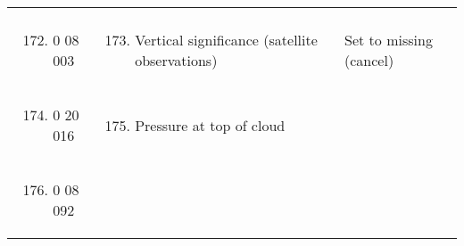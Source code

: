 \begin{longtable}[]{@{}llll@{}}
\begin{minipage}[t]{0.22\columnwidth}
\strut
\end{minipage}\tabularnewline
\begin{minipage}[t]{0.22\columnwidth}\raggedright
\strut
\end{minipage} & \begin{minipage}[t]{0.22\columnwidth}\raggedright
\begin{enumerate}
\setcounter{enumi}{171}
\item
  0 08 003
\end{enumerate}\strut
\end{minipage} & \begin{minipage}[t]{0.22\columnwidth}\raggedright
\begin{enumerate}
\setcounter{enumi}{172}
\item
  Vertical significance (satellite observations)
\end{enumerate}\strut
\end{minipage} & \begin{minipage}[t]{0.22\columnwidth}\raggedright
Set to missing (cancel)\strut
\end{minipage}\tabularnewline
\begin{minipage}[t]{0.22\columnwidth}\raggedright
\strut
\end{minipage} & \begin{minipage}[t]{0.22\columnwidth}\raggedright
\begin{enumerate}
\setcounter{enumi}{173}
\item
  0 20 016
\end{enumerate}\strut
\end{minipage} & \begin{minipage}[t]{0.22\columnwidth}\raggedright
\begin{enumerate}
\setcounter{enumi}{174}
\item
  Pressure at top of cloud
\end{enumerate}\strut
\end{minipage} & \begin{minipage}[t]{0.22\columnwidth}\raggedright
\strut
\end{minipage}\tabularnewline
\begin{minipage}[t]{0.22\columnwidth}\raggedright
\strut
\end{minipage} & \begin{minipage}[t]{0.22\columnwidth}\raggedright
\begin{enumerate}
\setcounter{enumi}{175}
\item
  0 08 092
\end{enumerate}\strut

\end{minipage}
\end{longtable}

